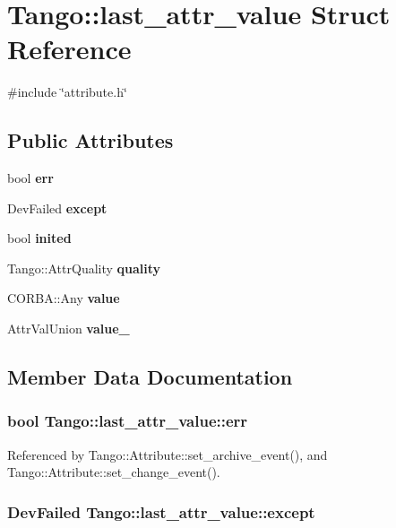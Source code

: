 \section{Tango\-:\-:last\-\_\-attr\-\_\-value Struct Reference}
\label{structTango_1_1last__attr__value}


{\ttfamily \#include \char`\"{}attribute.\-h\char`\"{}}

\subsection*{Public Attributes}
\begin{DoxyCompactItemize}
\item 
bool {\bf err}
\item 
Dev\-Failed {\bf except}
\item 
bool {\bf inited}
\item 
Tango\-::\-Attr\-Quality {\bf quality}
\item 
C\-O\-R\-B\-A\-::\-Any {\bf value}
\item 
Attr\-Val\-Union {\bf value\-\_}
\end{DoxyCompactItemize}


\subsection{Member Data Documentation}
\subsubsection[{err}]{\setlength{\rightskip}{0pt plus 5cm}bool Tango\-::last\-\_\-attr\-\_\-value\-::err}\label{structTango_1_1last__attr__value_af487fd6770e15dc987c30a671d0799ce}


Referenced by Tango\-::\-Attribute\-::set\-\_\-archive\-\_\-event(), and Tango\-::\-Attribute\-::set\-\_\-change\-\_\-event().

\subsubsection[{except}]{\setlength{\rightskip}{0pt plus 5cm}Dev\-Failed Tango\-::last\-\_\-attr\-\_\-value\-::except}\label{structTango_1_1last__attr__value_a854e14f33e75bdcea27483fd791ff307}
